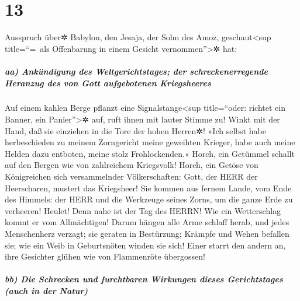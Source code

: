 \hypertarget{section-12}{%
\section{13}\label{section-12}}

Ausspruch über✲ Babylon, den Jesaja, der Sohn des Amoz,
geschaut\textless sup title=``=~als Offenbarung in einem Gesicht
vernommen''\textgreater✲ hat:

\hypertarget{aa-ankuxfcndigung-des-weltgerichtstages-der-schreckenerregende-heranzug-des-von-gott-aufgebotenen-kriegsheeres}{%
\subparagraph{aa) Ankündigung des Weltgerichtstages; der
schreckenerregende Heranzug des von Gott aufgebotenen
Kriegsheeres}\label{aa-ankuxfcndigung-des-weltgerichtstages-der-schreckenerregende-heranzug-des-von-gott-aufgebotenen-kriegsheeres}}

Auf einem kahlen Berge pflanzt eine
Signalstange\textless sup title=``oder: richtet ein Banner, ein
Panier''\textgreater✲ auf, ruft ihnen mit lauter Stimme zu! Winkt mit
der Hand, daß sie einziehen in die Tore der hohen Herren✲!
»Ich selbst habe herbeschieden zu meinem Zorngericht meine
geweihten Krieger, habe auch meine Helden dazu entboten, meine stolz
Frohlockenden.« Horch, ein Getümmel schallt auf den Bergen
wie von zahlreichem Kriegsvolk! Horch, ein Getöse von Königreichen sich
versammelnder Völkerschaften: Gott, der HERR der Heerscharen, mustert
das Kriegsheer! Sie kommen aus fernem Lande, vom Ende des
Himmels: der HERR und die Werkzeuge seines Zorns, um die ganze Erde zu
verheeren! Heulet! Denn nahe ist der Tag des HERRN! Wie
ein Wetterschlag kommt er vom Allmächtigen! Darum hängen
alle Arme schlaff herab, und jedes Menschenherz verzagt;
sie geraten in Bestürzung; Krämpfe und Wehen befallen sie;
wie ein Weib in Geburtsnöten winden sie sich! Einer starrt den andern
an, ihre Gesichter glühen wie von Flammenröte übergossen!

\hypertarget{bb-die-schrecken-und-furchtbaren-wirkungen-dieses-gerichtstages-auch-in-der-natur}{%
\subparagraph{bb) Die Schrecken und furchtbaren Wirkungen dieses
Gerichtstages (auch in der
Natur)}\label{bb-die-schrecken-und-furchtbaren-wirkungen-dieses-gerichtstages-auch-in-der-natur}}

